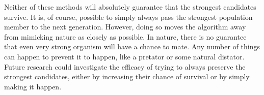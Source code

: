 Neither of these methods will absolutely guarantee that the strongest candidates survive. It is, of course, possible to simply always pass the strongest population member to the next generation. However, doing so moves the algorithm away from mimicking nature as closely as possible. In nature, there is no guarantee that even very strong organism will have a chance to mate. Any number of things can happen to prevent it to happen, like a pretator or some natural distator. Future research could investigate the efficacy of trying to always preserve the strongest candidates, either by increasing their chance of survival or by simply making it happen. 